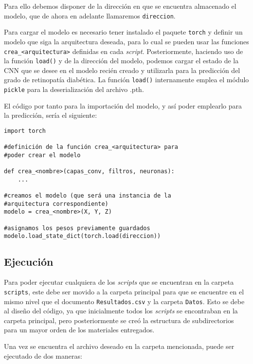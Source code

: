 Para ello debemos disponer de la dirección en que se encuentra almacenado el modelo, que de ahora en adelante llamaremos \texttt{direccion}.

Para cargar el modelo es necesario tener instalado el paquete \texttt{torch} y definir un modelo que siga la arquitectura deseada, para lo cual se pueden usar las funciones \texttt{crea\_<arquitectura>} definidas en cada \textit{script}. Posteriormente, haciendo uso de la función \texttt{load()} y de la dirección del modelo, podemos cargar el estado de la CNN que se desee en el modelo recién creado y utilizarla para la predicción del grado de retinopatía diabética. La función \texttt{load()} internamente emplea el módulo \texttt{pickle} para la deserialización del archivo .pth.

El código por tanto para la importación del modelo, y así poder emplearlo para la predicción, sería el siguiente:

\begin{verbatim}
import torch

#definición de la función crea_<arquitectura> para 
#poder crear el modelo

def crea_<nombre>(capas_conv, filtros, neuronas):
    ...

#creamos el modelo (que será una instancia de la
#arquitectura correspondiente)
modelo = crea_<nombre>(X, Y, Z)

#asignamos los pesos previamente guardados
modelo.load_state_dict(torch.load(direccion))
\end{verbatim}

\subsection{Ejecución}

Para poder ejecutar cualquiera de los \textit{scripts} que se encuentran en la carpeta \texttt{scripts}, este debe ser movido a la carpeta principal para que se encuentre en el mismo nivel que el documento \texttt{Resultados.csv} y la carpeta \texttt{Datos}. Esto se debe al diseño del código, ya que inicialmente todos los \textit{scripts} se encontraban en la carpeta principal, pero posteriormente se creó la estructura de subdirectorios para un mayor orden de los materiales entregados.

Una vez se encuentra el archivo deseado en la carpeta mencionada, puede ser ejecutado de dos maneras:

